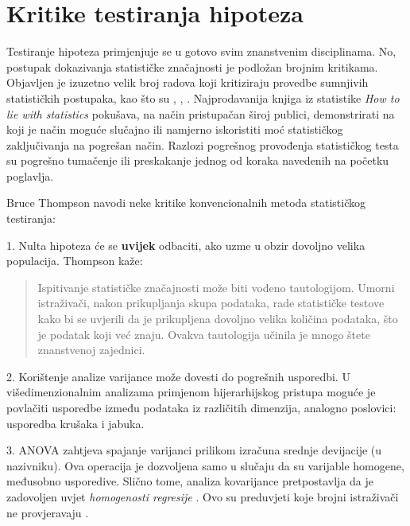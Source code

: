 \section{Kritike testiranja hipoteza}
\label{sec:critique}
Testiranje hipoteza primjenjuje se u gotovo svim znanstvenim disciplinama. No, postupak dokazivanja statističke značajnosti je podložan brojnim kritikama. Objavljen je izuzetno velik broj radova koji kritiziraju provedbe sumnjivih statističkih postupaka, kao što su \citep{hedges1985statistical}, \citep{dar1994misuse}, \citep{yoccoz1991use}. Najprodavanija knjiga iz statistike \textit{How to lie with statistics} \citep{huff2010lie} pokušava, na način pristupačan široj publici, demonstrirati na koji je način moguće slučajno ili namjerno iskoristiti moć statističkog zaključivanja na pogrešan način. Razlozi pogrešnog provođenja statističkog testa su pogrešno tumačenje ili preskakanje jednog od koraka navedenih na početku poglavlja.

Bruce Thompson \citep{thompson1993use} navodi neke kritike konvencionalnih metoda statističkog testiranja:

1. Nulta hipoteza će se \textbf{uvijek} odbaciti, ako uzme u obzir dovoljno velika populacija. Thompson kaže:
	
\begin{quote}
Ispitivanje statističke značajnosti može biti vođeno tautologijom. Umorni istraživači, nakon prikupljanja skupa podataka, rade statističke testove kako bi se uvjerili da je prikupljena dovoljno velika količina podataka, što je podatak koji već znaju. Ovakva tautologija učinila je mnogo štete znanstvenoj zajednici.
\end{quote}

2. Korištenje analize varijance  može dovesti do pogrešnih usporedbi. U višedimenzionalnim analizama primjenom hijerarhijskog pristupa moguće je povlačiti usporedbe između podataka iz različitih dimenzija, analogno poslovici: usporedba krušaka i jabuka. 

3. ANOVA zahtjeva spajanje varijanci prilikom izračuna srednje devijacije (u nazivniku). Ova operacija je dozvoljena samo u slučaju da su varijable homogene, međusobno usporedive. Slično tome, analiza kovarijance  pretpostavlja da je zadovoljen uvjet \textit{homogenosti regresije} . Ovo su preduvjeti koje brojni istraživači ne provjeravaju \citep{thompson1993use}.


